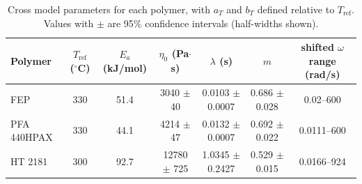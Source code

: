 \begin{table}[htbp]
\centering
\begin{tabular}{lcccccc}
\toprule
Polymer & $T_{\mathrm{ref}}$ ($^\circ$C) & $E_a$ (kJ/mol) & $\eta_0$ (Pa$\cdot$s) & $\lambda$ (s) & $m$ & shifted $\omega$ range (rad/s) \\
\midrule
FEP & 330 & 51.4 & 3040 $\pm$ 40 & 0.0103 $\pm$ 0.0007 & 0.686 $\pm$ 0.028 & 0.02--600 \\
PFA 440HPAX & 330 & 44.1 & 4214 $\pm$ 47 & 0.0132 $\pm$ 0.0007 & 0.692 $\pm$ 0.022 & 0.0111--600 \\
HT 2181 & 300 & 92.7 & 12780 $\pm$ 725 & 1.0345 $\pm$ 0.2427 & 0.529 $\pm$ 0.015 & 0.0166--924 \\
\bottomrule
\end{tabular}
\caption{Cross model parameters for each polymer, with $a_T$ and $b_T$ defined relative to $T_{\mathrm{ref}}$. Values with $\pm$ are 95\% confidence intervals (half-widths shown).}
\label{tab:cross_model_parameters}
\end{table}
